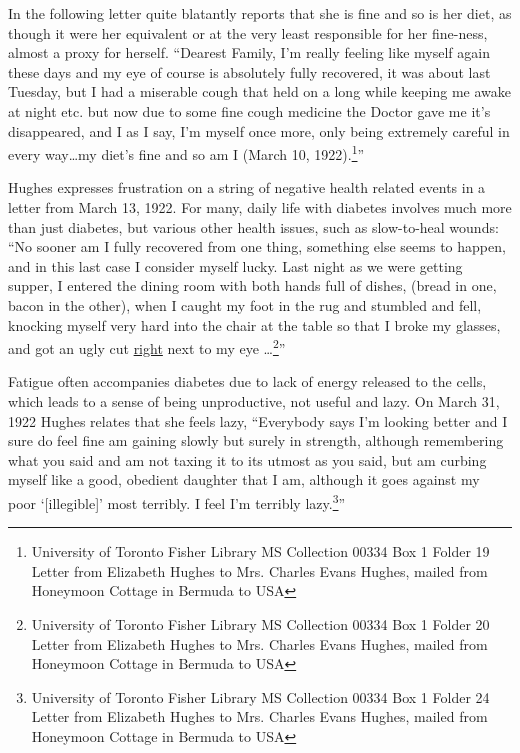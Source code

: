 \documentclass[12pt]{article}
\begin{document}
In the following letter quite blatantly reports that she is fine and so is her diet, as though it were her equivalent or at the very least responsible for her fine-ness, almost a proxy for herself. 
``Dearest Family, I'm really feeling like myself again these days and my eye of course is absolutely fully recovered, it was about last Tuesday, but I had a miserable cough that held on a long while keeping me awake at night etc. but now due to some fine cough medicine the Doctor gave me it's disappeared, and I as I say, I'm myself once more, only being extremely careful in every way\dots my diet's fine and so am I (March 10, 1922).\footnote{University of Toronto Fisher Library MS Collection 00334 Box 1 Folder 19 Letter from Elizabeth Hughes to Mrs. Charles Evans Hughes, mailed from Honeymoon Cottage in Bermuda to USA}''


Hughes expresses frustration on a string of negative health related events in a letter from March 13, 1922. For many, daily life with diabetes involves much more than just diabetes, but various other health issues, such as slow-to-heal wounds:
``No sooner am I fully recovered from one thing, something else seems to happen, and in this last case I consider myself  lucky. Last night as we were getting supper, I entered the dining room with both hands full of dishes, (bread in one, bacon in the other), when I caught my foot in the rug and stumbled and fell, knocking myself very hard into the chair at the table so that I broke my glasses, and got an ugly cut \underline{right} next to my eye \dots \footnote{University of Toronto Fisher Library MS Collection 00334 Box 1 Folder 20 Letter from Elizabeth Hughes to Mrs. Charles Evans Hughes, mailed from Honeymoon Cottage in Bermuda to USA}'' 



Fatigue often accompanies diabetes due to lack of energy released to the cells, which leads to a sense of being unproductive, not useful and lazy.  On March 31, 1922 Hughes relates that she feels lazy, ``Everybody says I'm looking better and I sure do feel fine am gaining slowly but surely in strength, although remembering what you said and am not taxing it to its utmost as you said, but am curbing myself like a good, obedient daughter that I am, although it goes against my poor `[illegible]' most terribly. I feel I'm terribly lazy.\footnote{University of Toronto Fisher Library MS Collection 00334 Box 1 Folder 24 Letter from Elizabeth Hughes to Mrs. Charles Evans Hughes, mailed from Honeymoon Cottage in Bermuda to USA}'' 
\end{document}
